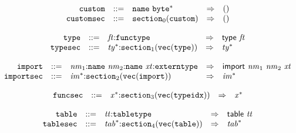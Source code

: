 \vspace{1ex}

$$
\begin{array}{@{}l@{}rrlll@{}l@{}}
& {\mathtt{custom}} &::=& {\mathtt{name}}~{{\mathtt{byte}}^\ast} &\Rightarrow& () \\
& {\mathtt{customsec}} &::=& {{\mathtt{section}}}_{0}({\mathtt{custom}}) &\Rightarrow& () \\
\end{array}
$$

\vspace{1ex}

$$
\begin{array}{@{}l@{}rrlll@{}l@{}}
& {\mathtt{type}} &::=& {\mathit{ft}}{:}{\mathtt{functype}} &\Rightarrow& \mathsf{type}~{\mathit{ft}} \\
& {\mathtt{typesec}} &::=& {{\mathit{ty}}^\ast}{:}{{\mathtt{section}}}_{1}({\mathtt{vec}}({\mathtt{type}})) &\Rightarrow& {{\mathit{ty}}^\ast} \\
\end{array}
$$

\vspace{1ex}

$$
\begin{array}{@{}l@{}rrlll@{}l@{}}
& {\mathtt{import}} &::=& {\mathit{nm}}_{{1}}{:}{\mathtt{name}}~{\mathit{nm}}_{{2}}{:}{\mathtt{name}}~{\mathit{xt}}{:}{\mathtt{externtype}} &\Rightarrow& \mathsf{import}~{\mathit{nm}}_{{1}}~{\mathit{nm}}_{{2}}~{\mathit{xt}} \\
& {\mathtt{importsec}} &::=& {{\mathit{im}}^\ast}{:}{{\mathtt{section}}}_{2}({\mathtt{vec}}({\mathtt{import}})) &\Rightarrow& {{\mathit{im}}^\ast} \\
\end{array}
$$

\vspace{1ex}

$$
\begin{array}{@{}l@{}rrlll@{}l@{}}
& {\mathtt{funcsec}} &::=& {{\mathit{x}}^\ast}{:}{{\mathtt{section}}}_{3}({\mathtt{vec}}({\mathtt{typeidx}})) &\Rightarrow& {{\mathit{x}}^\ast} \\
\end{array}
$$

\vspace{1ex}

$$
\begin{array}{@{}l@{}rrlll@{}l@{}}
& {\mathtt{table}} &::=& {\mathit{tt}}{:}{\mathtt{tabletype}} &\Rightarrow& \mathsf{table}~{\mathit{tt}} \\
& {\mathtt{tablesec}} &::=& {{\mathit{tab}}^\ast}{:}{{\mathtt{section}}}_{4}({\mathtt{vec}}({\mathtt{table}})) &\Rightarrow& {{\mathit{tab}}^\ast} \\
\end{array}
$$

